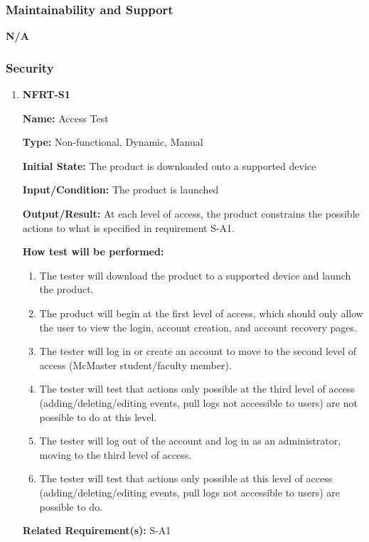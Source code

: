 \documentclass[12pt, titlepage]{article}
\begin{document}
\subsubsection{Maintainability and Support}

\quad \textbf{N/A}

\subsubsection{Security}

\begin{enumerate}
\item{\textbf{NFRT-S1}}

\textbf{Name:} Access Test
  
\textbf{Type:} Non-functional, Dynamic, Manual
            
\textbf{Initial State:} The product is downloaded onto a supported device
  
\textbf{Input/Condition:} The product is launched
            
\textbf{Output/Result:} At each level of access, the product constrains the possible actions to what is specified in requirement S-A1.
  
\textbf{How test will be performed:}
\begin{enumerate}
  \item The tester will download the product to a supported device and launch the product.
  \item The product will begin at the first level of access, which should only allow the user to view the login, account creation, and account recovery pages.
  \item The tester will log in or create an account to move to the second level of access (McMaster student/faculty member).
  \item The tester will test that actions only possible at the third level of access (adding/deleting/editing events, pull logs not accessible to users) are not possible to do at this level.
  \item The tester will log out of the account and log in as an administrator, moving to the third level of access.
  \item The tester will test that actions only possible at this level of access (adding/deleting/editing events, pull logs not accessible to users) are possible to do.
\end{enumerate}

\textbf{Related Requirement(s):} S-A1


\end{enumerate}
\end{document}
